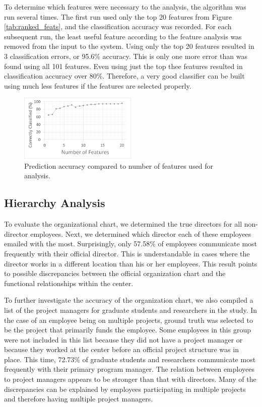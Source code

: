\documentclass{article}
\begin{document}
To determine which features were necessary to the analysis, the algorithm was run several times.  The first run used only the top 20 features from Figure \ref{tab:ranked_feats}, and the classification accuracy was recorded.  For each subsequent run, the least useful feature according to the feature analysis was removed from the input to the system.  Using only the top 20 features resulted in 3 classification errors, or 95.6\% accuracy.  This is only one more error than was found using all 101 features.  Even using just the top thee features resulted in classification accuracy over 80\%.  Therefore, a very good classifier can be built using much less features if the features are selected properly.
\begin{figure}[H]
    \centering
        \includegraphics[width=0.5\textwidth]{FeatureAnalysis}
        \caption{Prediction accuracy compared to number of features used for analysis.}
        \label{fig:feat_analysis}
\end{figure}

\subsection{Hierarchy Analysis}
To evaluate the organizational chart, we determined the true directors for all non-director employees.  Next, we determined which director each of these employees emailed with the most.  Surprisingly, only 57.58\% of employees communicate most frequently with their official director.  This is understandable in cases where the director works in a different location than his or her employees.  This result points to possible discrepancies between the official organization chart and the functional  relationships within the center.
\par
To further investigate the accuracy of the organization chart, we also compiled a list of the project managers for graduate students and researchers in the study.  In the case of an employee being on multiple projects, ground truth was selected to be the project that primarily funds the employee.  Some employees in this group were not included in this list because they did not have a project manager or because they worked at the center before an official project structure was in place.  This time, 72.73\% of graduate students and researchers communicate most frequently with their primary program manager.  The relation between employees to project managers appears to be stronger than that with directors.  Many of the discrepancies can be explained by employees participating in multiple projects and therefore having multiple project managers.
\end{document}
